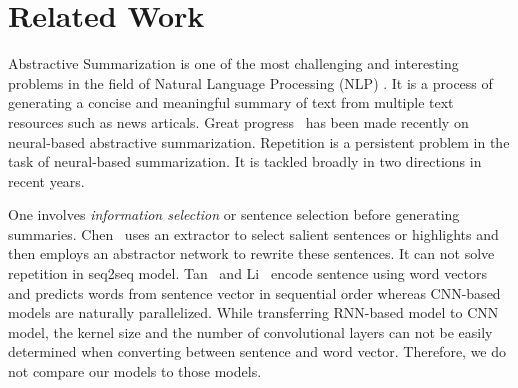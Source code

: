 \section{Related Work}
\label{sec:related}

Abstractive Summarization
is one of the most challenging and interesting problems 
in the field of Natural Language Processing (NLP)
\cite{CareniniC08,PallottaDB09,SankarasubramaniamRG14,BingLLLGP15,RushCW15,LiHZ16,YaoWX17,MohamedO19,LierdeC19,NguyenCNN19}.
It is a process of generating a concise and meaningful summary of text from multiple text resources 
such as news articals.
Great progress~
\cite{RushCW15,ChopraAR16,NallapatiZSGX16,SeeLM17,PaulusXS17,HardyV18,KourisAS19,LiuL19,ZhangWZ19,WangQW19}
has been made recently on
neural-based abstractive summarization.
Repetition is a persistent problem in the task of 
neural-based summarization. 
It is tackled broadly in two directions in recent years. 

One involves {\em information selection} or sentence
selection before generating summaries.
Chen~\cite{P18-1063} uses an extractor  
to select salient sentences or highlights and then employs 
an abstractor network to rewrite these sentences.
It can not solve repetition in seq2seq model.
Tan~\cite{TanWX17} and Li~\cite{D18-1205,D18-1441} encode
sentence using word vectors
and predicts words from sentence vector in sequential order 
whereas CNN-based models are naturally parallelized. 
While transferring RNN-based model to CNN model, 
the kernel size and the number of 
convolutional layers can not be easily determined when
converting between sentence and word vector. 
Therefore, we do not compare our models to those models. 

